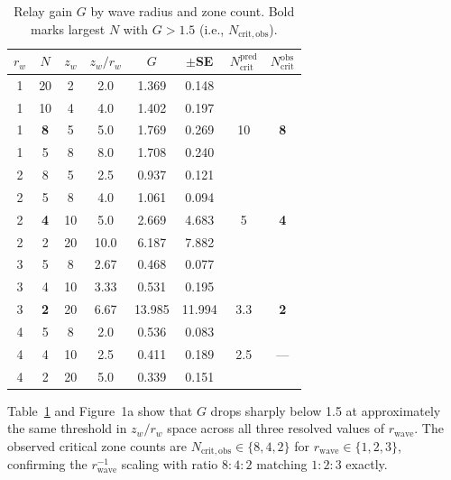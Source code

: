 \documentclass[11pt]{article}
\begin{document}
\begin{table}[h]
  \centering
  \caption{Relay gain $G$ by wave radius and zone count. Bold marks largest
           $N$ with $G > 1.5$ (i.e., $N_\mathrm{crit,obs}$).}
  \label{tab:rwave}
  \small
  \begin{tabular}{cccccccc}
    \toprule
    $r_w$ & $N$ & $z_w$ & $z_w/r_w$ & $G$ & $\pm$SE
          & $N_\mathrm{crit}^\mathrm{pred}$ & $N_\mathrm{crit}^\mathrm{obs}$ \\
    \midrule
    1 & 20 & 2 & 2.0 & 1.369 & 0.148 & & \\
    1 & 10 & 4 & 4.0 & 1.402 & 0.197 & & \\
    1 & \textbf{8} & 5 & 5.0 & 1.769 & 0.269 & 10 & \textbf{8} \\
    1 & 5  & 8 & 8.0 & 1.708 & 0.240 & & \\
    \midrule
    2 & 8 & 5 & 2.5 & 0.937 & 0.121 & & \\
    2 & 5 & 8 & 4.0 & 1.061 & 0.094 & & \\
    2 & \textbf{4} & 10 & 5.0 & 2.669 & 4.683 & 5 & \textbf{4} \\
    2 & 2 & 20 & 10.0 & 6.187 & 7.882 & & \\
    \midrule
    3 & 5 & 8 & 2.67 & 0.468 & 0.077 & & \\
    3 & 4 & 10 & 3.33 & 0.531 & 0.195 & & \\
    3 & \textbf{2} & 20 & 6.67 & 13.985 & 11.994 & 3.3 & \textbf{2} \\
    \midrule
    4 & 5 & 8 & 2.0 & 0.536 & 0.083 & & \\
    4 & 4 & 10 & 2.5 & 0.411 & 0.189 & 2.5 & --- \\
    4 & 2 & 20 & 5.0 & 0.339 & 0.151 & & \\
    \bottomrule
  \end{tabular}
\end{table}

Table~\ref{tab:rwave} and Figure~1a show that $G$ drops sharply below 1.5
at approximately the same threshold in $z_w/r_w$ space across all three
resolved values of $r_\mathrm{wave}$.
The observed critical zone counts are $N_\mathrm{crit,obs} \in \{8, 4, 2\}$
for $r_\mathrm{wave} \in \{1, 2, 3\}$, confirming the $r_\mathrm{wave}^{-1}$
scaling with ratio $8:4:2$ matching $1:2:3$ exactly.
\end{document}

